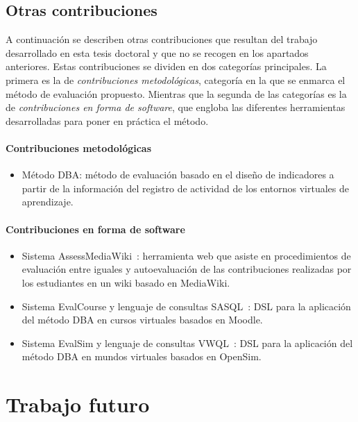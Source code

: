	\subsection*{Otras contribuciones}

	A continuación se describen otras contribuciones que resultan del trabajo desarrollado en esta tesis doctoral y que no se recogen en los apartados anteriores. Estas contribuciones se dividen en dos categorías principales. La primera es la de \emph{contribuciones metodológicas}, categoría en la que se enmarca el método de evaluación propuesto. Mientras que la segunda de las categorías es la de \emph{contribuciones en forma de software}, que engloba las diferentes herramientas desarrolladas para poner en práctica el método.

	\paragraph*{Contribuciones metodológicas}

	\begin{itemize}
	\item Método DBA: método de evaluación basado en el diseño de indicadores a partir de la información del registro de actividad de los entornos virtuales de aprendizaje.
	\end{itemize}

	\paragraph*{Contribuciones en forma de software}

	\begin{itemize}
	\item Sistema AssessMediaWiki~\cite{Balderas:2012}: herramienta web que asiste en procedimientos de evaluación entre iguales y autoevaluación de las contribuciones realizadas por los estudiantes en un wiki basado en MediaWiki.
	\item Sistema EvalCourse y lenguaje de consultas SASQL~\cite{Balderas:2013,balderas2013generative,Balderas:2015}: DSL para la aplicación del método DBA en cursos virtuales basados en Moodle.
	\item Sistema EvalSim y lenguaje de consultas VWQL~\cite{balderas2015domain}: DSL para la aplicación del método DBA en mundos virtuales basados en OpenSim.

	\end{itemize}

\section{Trabajo futuro}


